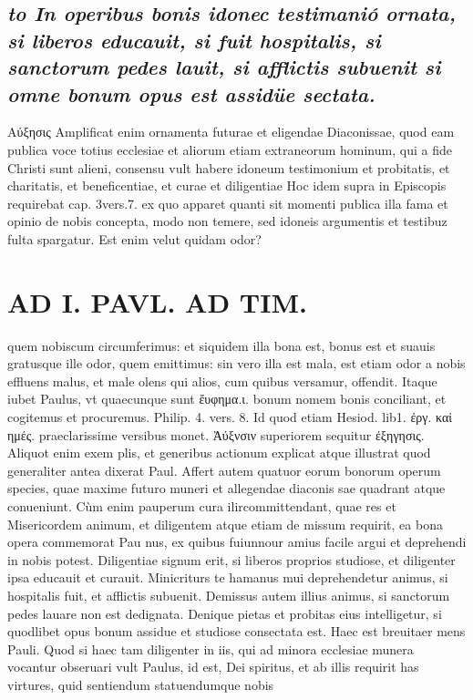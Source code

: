 \documentclass{article}
\begin{document}
\begin{pages}
\subsection*{\textit{to In operibus bonis idonec testimanió ornata, si liberos educauit, si fuit hospitalis, si sanctorum pedes lauit, si afflictis subuenit si omne bonum opus est assidüe sectata. }}\pstart Αύξησις Amplificat enim ornamenta futurae et eligendae Diaconissae, quod eam publica voce totius ecclesiae et aliorum etiam extraneorum hominum, qui a fide Christi sunt alieni, consensu vult habere idoneum testimonium et probitatis, et charitatis, et beneficentiae, et curae et diligentiae Hoc idem supra in Episcopis requirebat cap. 3vers.7. ex quo apparet quanti sit momenti publica illa fama et opinio de nobis concepta, modo non temere, sed idoneis argumentis et testibuz fulta spargatur. Est enim velut quidam odor?  \pend
\section*{AD I. PAVL. AD TIM. }
\marginpar{[ p.270 ]}\pstart quem nobiscum circumferimus: et siquidem illa bona est, bonus est et suauis gratusque ille odor, quem emittimus: sin vero illa est mala, est etiam odor a nobis effluens malus, et male olens qui alios, cum quibus versamur, offendit. Itaque iubet Paulus, vt quaecunque sunt ἔυφημα.ι. bonum nomem bonis conciliant, et cogitemus et procuremus. Philip. 4. vers. 8. Id quod etiam Hesiod. lib1. ἐργ. καἰ ημές. praeclarissime versibus monet. Ἀύξνσιν superiorem sequitur ἐξηγησις. Aliquot enim exem plis, et generibus actionum explicat atque illustrat quod generaliter antea dixerat Paul. Affert autem quatuor eorum bonorum operum species, quae maxime futuro muneri et allegendae diaconis sae quadrant atque conueniunt. Cùm enim pauperum cura ilircommittendant, quae res et Misericordem animum, et diligentem atque etiam de missum requirit, ea bona opera commemorat Pau nus, ex quibus fuiunnour amius facile argui et deprehendi in nobis potest.  \pend\pstart Diligentiae signum erit, si liberos proprios studiose, et diligenter ipsa educauit et curauit.   \pend\pstart Minicriturs te hamanus mui deprehendetur animus, si hospitalis fuit, et afflictis subuenit.  \pend\pstart Demissus autem illius animus, si sanctorum pedes lauare non est dedignata.  \pend\pstart Denique pietas et probitas eius intelligetur, si quodlibet opus bonum assidue et studiose consectata est. Haec est breuitaer mens Pauli.  \pend\pstart Quod si haec tam diligenter in iis, qui ad minora ecclesiae munera vocantur obseruari vult Paulus, id est, Dei spiritus, et ab illis requirit has virtures, quid sentiendum statuendumque nobis  \pend

\end{pages}
\end{document}
